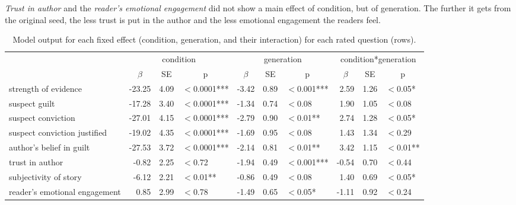 \documentclass[10pt,letterpaper]{article}
\begin{document}
\textit{Trust in author} and the \textit{reader's emotional engagement} did not show a main effect of condition, but of generation. The further it gets from the original seed, the less trust is put in the author and the less emotional engagement the readers feel.


	\begin{table}
		\centering
		\caption{Model output for each fixed effect (condition, generation, and their interaction) for each rated question (rows).}
		\vskip 0.12in
		\begin{tabular}{l r r l r r l r r l }
			\toprule
			& \multicolumn{3}{c}{condition} & \multicolumn{3}{c}{generation} & \multicolumn{3}{c}{condition*generation} \\
			& \multicolumn{1}{c}{$\beta$} & \multicolumn{1}{c}{SE} & \multicolumn{1}{c}{p} & \multicolumn{1}{c}{$\beta$} & \multicolumn{1}{c}{SE} & \multicolumn{1}{c}{p} & \multicolumn{1}{c}{$\beta$} & \multicolumn{1}{c}{SE} & \multicolumn{1}{c}{p}\\
			\midrule
			strength of evidence    & -23.25 & 4.09 & $<$0.0001***        & -3.42 & 0.89 & $<$0.001*** & 2.59  & 1.26 & $<$0.05*\\
			suspect guilt          & -17.28  & 3.40 & $<$0.0001***              & -1.34 & 0.74 & $<$0.08           & 1.90  & 1.05 & $<$0.08\\
			suspect conviction   & -27.01 & 4.15  & $<$0.0001***            & -2.79 & 0.90 & $<$0.01**     & 2.74  & 1.28 & $<$0.05*\\
			suspect conviction justified    & -19.02 & 4.35 & $<$0.0001***  & -1.69 & 0.95 & $<$0.08      & 1.43 & 1.34 & $<$0.29\\
			author's belief in guilt     & -27.53 & 3.72 & $<$0.0001***     & -2.14 & 0.81 & $<$0.01**      & 3.42  & 1.15 & $<$0.01**\\
			trust in author           & -0.82   & 2.25 & $<$0.72                  & -1.94 & 0.49 & $<$0.001*** & -0.54 & 0.70 & $<$0.44 \\
			subjectivity of story  & -6.12   & 2.21 & $<$0.01**                 & -0.86 & 0.49 & $<$0.08         & 1.40   & 0.69 & $<$0.05*\\
			reader's emotional engagement  & 0.85   & 2.99 & $<$0.78   & -1.49 & 0.65 & $<$0.05*     & -1.11  & 0.92 & $<$0.24\\
					\bottomrule
		\end{tabular}
		\label{tab:exp2results}
	\end{table}
\end{document}
